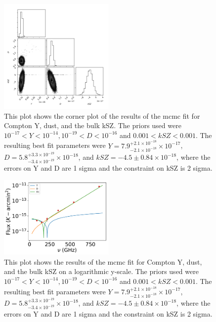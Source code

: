 \documentclass{princeton_astro_thesis}
\begin{document}
\begin{figure}[h]
\centering
\includegraphics[width=0.5\textwidth]{../BulkkSZplot.pdf}
\caption{This plot shows the corner plot of the results of the mcmc fit for Compton Y, dust, and the bulk kSZ. The priors used were $ 10^{-17} < Y < 10^{-14}, 10^{-19}< D < 10^{-16}$ and $0.001 < kSZ <0.001.$ The resulting best fit parameters were $Y=7.9^{+2.1\times10^{-18}}_{-2.1\times10^{-18}}\times10^{-17}$, $D=5.8^{+3.3\times10^{-19}}_{-3.4\times10^{-19}}\times10^{-18}$, and $kSZ=-4.5\pm0.84\times10^{-18}$, where the errors on Y and D are 1 sigma and the constraint on kSZ is 2 sigma.}
\end{figure}

\begin{figure}[h]
\centering
\includegraphics[width=0.5\textwidth]{../redmapper_apfluxes_kSZfitlog.pdf}
\caption{This plot shows  the results of the mcmc fit for Compton Y, dust, and the bulk kSZ on a logarithmic y-scale. The priors used were $ 10^{-17} < Y < 10^{-14}, 10^{-19}< D < 10^{-16}$ and $0.001 < kSZ <0.001.$ The resulting best fit parameters were $Y=7.9^{+2.1\times10^{-18}}_{-2.1\times10^{-18}}\times10^{-17}$, $D=5.8^{+3.3\times10^{-19}}_{-3.4\times10^{-19}}\times10^{-18}$, and $kSZ=-4.5\pm0.84\times10^{-18}$, where the errors on Y and D are 1 sigma and the constraint on kSZ is 2 sigma.} %
\end{figure}
\end{document}
